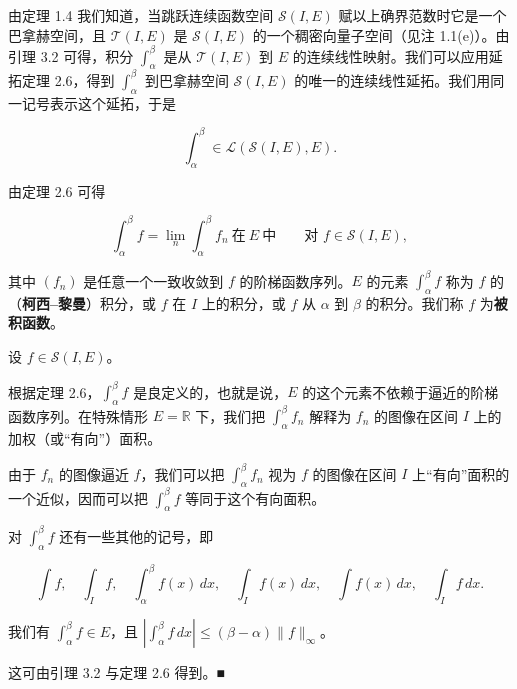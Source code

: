 由定理 1.4 我们知道，当跳跃连续函数空间 $ \mathcal{S}(I, E) $ 赋以上确界范数时它是一个巴拿赫空间，且 $ \mathcal{T}(I, E) $ 是 $ \mathcal{S}(I, E) $ 的一个稠密向量子空间（见注 1.1(e)）。由引理 3.2 可得，积分 $ \int_{\alpha}^{\beta} $ 是从 $ \mathcal{T}(I, E) $ 到 $ E $ 的连续线性映射。我们可以应用延拓定理 2.6，得到 $ \int_{\alpha}^{\beta} $ 到巴拿赫空间 $ \mathcal{S}(I, E) $ 的唯一的连续线性延拓。我们用同一记号表示这个延拓，于是

\[
\int_{\alpha}^{\beta} \in \mathcal{L}(\mathcal{S}(I, E), E) .
\]

由定理 2.6 可得

\[
\int_{\alpha}^{\beta} f = \lim_{n} \int_{\alpha}^{\beta} f_n \ \text{在}\ E\ \text{中} \qquad \text{对 } f \in \mathcal{S}(I, E) ,
\]

其中 $ (f_n) $ 是任意一个一致收敛到 $ f $ 的阶梯函数序列。$ E $ 的元素 $ \int_{\alpha}^{\beta} f $ 称为 $ f $ 的（\textbf{柯西–黎曼}）积分，或 $ f $ 在 $ I $ 上的积分，或 $ f $ 从 $ \alpha $ 到 $ \beta $ 的积分。我们称 $ f $ 为\textbf{被积函数}。

\begin{remark}

设 $ f \in \mathcal{S}(I, E) $。

\begin{items}
\item

根据定理 2.6，$ \int_{\alpha}^{\beta} f $ 是良定义的，也就是说，$ E $ 的这个元素不依赖于逼近的阶梯函数序列。在特殊情形 $ E = \mathbb{R} $ 下，我们把 $ \int_{\alpha}^{\beta} f_n $ 解释为 $ f_n $ 的图像在区间 $ I $ 上的加权（或“有向”）面积。

\end{items}


由于 $ f_n $ 的图像逼近 $ f $，我们可以把 $ \int_{\alpha}^{\beta} f_n $ 视为 $ f $ 的图像在区间 $ I $ 上“有向”面积的一个近似，因而可以把 $ \int_{\alpha}^{\beta} f $ 等同于这个有向面积。

\begin{items}
\item[（b）]

对 $ \int_{\alpha}^{\beta} f $ 还有一些其他的记号，即

\[
\int f , \quad \int_{I} f , \quad \int_{\alpha}^{\beta} f(x) \, dx , \quad \int_{I} f(x) \, dx , \quad \int f(x) \, dx , \quad \int_{I} f \, dx .
\]
\item[（c）]

我们有 $ \int_{\alpha}^{\beta} f \in E $，且 $ \left| \int_{\alpha}^{\beta} f \, dx \right| \le (\beta - \alpha) \|f\|_{\infty} $。

\proofhead
这可由引理 3.2 与定理 2.6 得到。\nobreak\hspace{0.35em}■
\end{items}

\end{remark}

